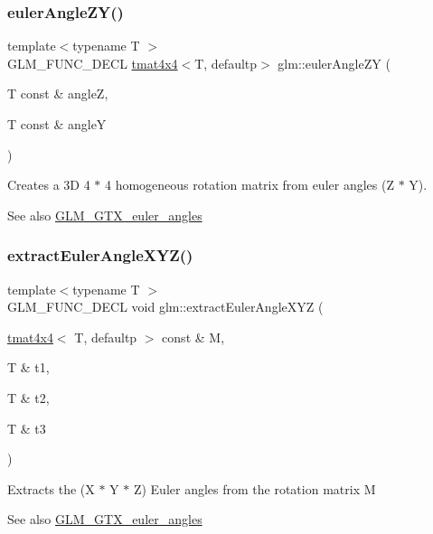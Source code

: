 \subsubsection{\texorpdfstring{euler\+Angle\+Z\+Y()}{eulerAngleZY()}}
{\footnotesize\ttfamily template$<$typename T $>$ \\
G\+L\+M\+\_\+\+F\+U\+N\+C\+\_\+\+D\+E\+CL \hyperlink{structglm_1_1tmat4x4}{tmat4x4}$<$T, defaultp$>$ glm\+::euler\+Angle\+ZY (\begin{DoxyParamCaption}\item[{T const \&}]{angleZ,  }\item[{T const \&}]{angleY }\end{DoxyParamCaption})}

Creates a 3D 4 $\ast$ 4 homogeneous rotation matrix from euler angles (Z $\ast$ Y). \begin{DoxySeeAlso}{See also}
\hyperlink{group__gtx__euler__angles}{G\+L\+M\+\_\+\+G\+T\+X\+\_\+euler\+\_\+angles} 
\end{DoxySeeAlso}
\mbox{\label{group__gtx__euler__angles_gad5838a4c87ce2b8ee4c4e17bd162fd14}} 
\subsubsection{\texorpdfstring{extract\+Euler\+Angle\+X\+Y\+Z()}{extractEulerAngleXYZ()}}
{\footnotesize\ttfamily template$<$typename T $>$ \\
G\+L\+M\+\_\+\+F\+U\+N\+C\+\_\+\+D\+E\+CL void glm\+::extract\+Euler\+Angle\+X\+YZ (\begin{DoxyParamCaption}\item[{\hyperlink{structglm_1_1tmat4x4}{tmat4x4}$<$ T, defaultp $>$ const \&}]{M,  }\item[{T \&}]{t1,  }\item[{T \&}]{t2,  }\item[{T \&}]{t3 }\end{DoxyParamCaption})}

Extracts the (X $\ast$ Y $\ast$ Z) Euler angles from the rotation matrix M \begin{DoxySeeAlso}{See also}
\hyperlink{group__gtx__euler__angles}{G\+L\+M\+\_\+\+G\+T\+X\+\_\+euler\+\_\+angles} 
\end{DoxySeeAlso}
\mbox{\label{group__gtx__euler__angles_ga6f465681cbbc575ad93a53ec918dacf3}} 
